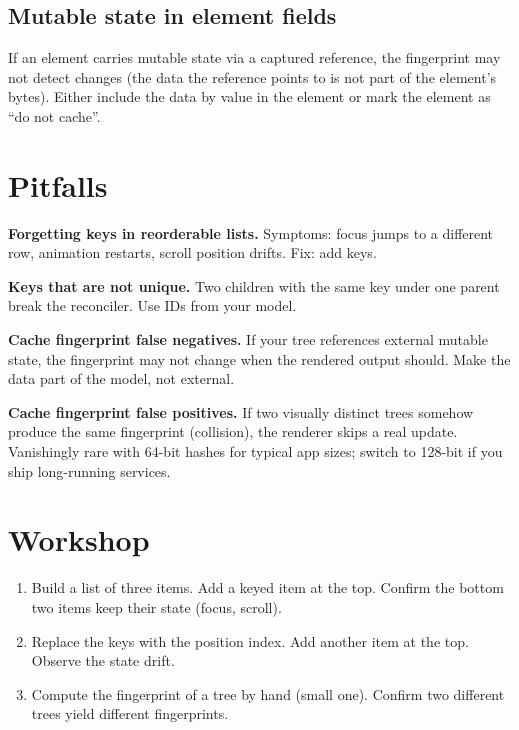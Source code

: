 \subsection*{Mutable state in element fields}

If an element carries mutable state via a captured reference,
the fingerprint may not detect changes (the data the reference
points to is not part of the element's bytes). Either include
the data by value in the element or mark the element as
``do not cache''.

\section{Pitfalls}

\begin{warning}
\textbf{Forgetting keys in reorderable lists.} Symptoms:
focus jumps to a different row, animation restarts, scroll
position drifts. Fix: add keys.
\end{warning}

\begin{warning}
\textbf{Keys that are not unique.} Two children with the same
key under one parent break the reconciler. Use IDs from
your model.
\end{warning}

\begin{warning}
\textbf{Cache fingerprint false negatives.} If your tree
references external mutable state, the fingerprint may not
change when the rendered output should. Make the data part
of the model, not external.
\end{warning}

\begin{warning}
\textbf{Cache fingerprint false positives.} If two visually
distinct trees somehow produce the same fingerprint
(collision), the renderer skips a real update. Vanishingly
rare with 64-bit hashes for typical app sizes; switch to
128-bit if you ship long-running services.
\end{warning}

\section*{Workshop}

\begin{enumerate}[leftmargin=*]
  \item Build a list of three items. Add a keyed item at the
    top. Confirm the bottom two items keep their state (focus,
    scroll).
  \item Replace the keys with the position index. Add another
    item at the top. Observe the state drift.
  \item Compute the fingerprint of a tree by hand (small one).
    Confirm two different trees yield different fingerprints.
\end{enumerate}

